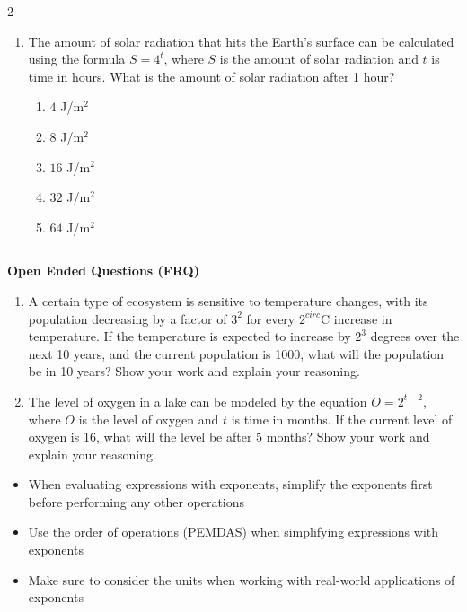 \documentclass[10pt]{article}
\begin{document}
\begin{multicols}{2}
\begin{enumerate}[label=\textbf{Q\arabic*.}, leftmargin=*, itemsep=6pt, parsep=0pt]
  \item \small The amount of solar radiation that hits the Earth's surface can be calculated using the formula $S = 4^t$, where $S$ is the amount of solar radiation and $t$ is time in hours. What is the amount of solar radiation after 1 hour?
  \begin{enumerate}[label=(\Alph*), leftmargin=0.6cm, nosep, itemsep=2pt]
    \item $4$ J/m$^2$
    \item $8$ J/m$^2$
    \item $16$ J/m$^2$
    \item $32$ J/m$^2$
    \item $64$ J/m$^2$
  \end{enumerate}

\end{enumerate}
\end{multicols}

\vspace{-0.2cm}
\hrule
\vspace{0.2cm}
\textbf{\small Open Ended Questions (FRQ)}
\begin{enumerate}[label=\textbf{Q\arabic*.}, start=9, itemsep=5pt, topsep=0pt]

  \item \small A certain type of ecosystem is sensitive to temperature changes, with its population decreasing by a factor of $3^2$ for every $2^{circ}$C increase in temperature. If the temperature is expected to increase by $2^3$ degrees over the next 10 years, and the current population is 1000, what will the population be in 10 years? Show your work and explain your reasoning. \vspace{2cm}

  \item \small The level of oxygen in a lake can be modeled by the equation $O = 2^{t-2}$, where $O$ is the level of oxygen and $t$ is time in months. If the current level of oxygen is 16, what will the level be after 5 months? Show your work and explain your reasoning. \vspace{2cm}

\end{enumerate}

\vfill

\begin{tcolorbox}[colback=blue!5, colframe=mainblue!50, title=\small \textbf{Chef's Tips}, fonttitle=\bfseries, bottom=1mm]
\begin{itemize}[noitemsep, topsep=2pt, leftmargin=0.5cm]
  \item \scriptsize When evaluating expressions with exponents, simplify the exponents first before performing any other operations\item \scriptsize Use the order of operations (PEMDAS) when simplifying expressions with exponents\item \scriptsize Make sure to consider the units when working with real-world applications of exponents
\end{itemize}
\end{tcolorbox}
\end{document}
